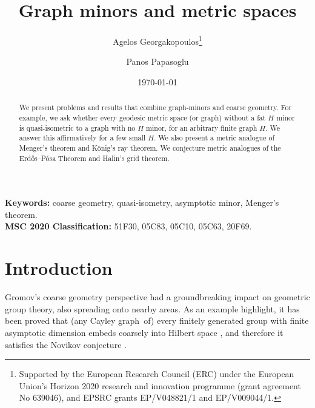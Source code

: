 \documentclass[a4paper]{article}
\newcommand{\Cg}{Cayley graph}
\newcommand{\Erd}{Erd\H{o}s}
\begin{document}
\title{Graph minors and metric spaces}

\author[1]{Agelos Georgakopoulos\thanks{Supported by the European Research Council (ERC) under the European Union's Horizon 2020 research and innovation programme (grant agreement No 639046), and EPSRC grants EP/V048821/1 and EP/V009044/1.}}
\author[2]{Panos Papasoglu}


\date{\today}
\maketitle


\begin{abstract}
We present problems and results that combine graph-minors and coarse geometry. For example, we ask whether every geodesic metric space (or graph) without a fat $H$ minor is quasi-isometric to a graph with no $H$ minor, for an arbitrary finite graph $H$. We answer this affirmatively for a few small $H$. We also present a metric analogue of Menger's theorem and K\"onig's ray theorem. We conjecture metric analogues of the \Erd--P\'osa Theorem and Halin's grid theorem.
\end{abstract}

{\bf{Keywords:} } coarse geometry, quasi-isometry, asymptotic minor, Menger's theorem.\\

{\bf{MSC 2020 Classification:}} 51F30, 05C83, 05C10, 05C63, 20F69.

\maketitle


\section{Introduction}

Gromov's \cite{GroAsyInv} coarse geometry perspective had a groundbreaking impact on geometric group theory, also spreading onto nearby areas. As an example highlight, it has been proved that (any \Cg\ of) every finitely generated group  with finite asymptotic dimension embeds coarsely into Hilbert space \cite{YuNov}, and therefore it satisfies the  Novikov conjecture \cite{GroAsyInv}. 
\end{document}
